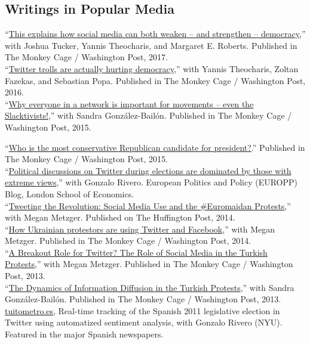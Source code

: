 \documentclass[margin,line,11pt]{resume}
\newcommand{\nl}{\vspace{0.10in}\\}
\begin{document}
\begin{resume}
                \section{\mysidestyle Writings in Popular Media}
``\href{https://www.washingtonpost.com/news/monkey-cage/wp/2017/12/06/this-explains-how-social-media-can-both-weaken-and-strengthen-democracy/?utm_term=.d52c930452e9}{This explains how social media can both weaken -- and strengthen -- democracy},'' with Joshua Tucker, Yannis Theocharis, and Margaret E. Roberts. Published in The Monkey Cage / Washington Post, 2017.\nl               
``\href{https://www.washingtonpost.com/news/monkey-cage/wp/2016/11/04/twitter-trolls-hurt-democracy-more-than-you-realize-heres-how/}{Twitter trolls are actually hurting democracy},'' with Yannis Theocharis, Zoltan Fazekas, and Sebastian Popa. Published in The Monkey Cage / Washington Post, 2016.\nl
``\href{https://www.washingtonpost.com/news/monkey-cage/wp/2015/11/30/why-everyone-in-a-network-is-important-for-movements-even-the-slactivists/}{Why everyone in a network is important for movements -- even the Slacktivists!},'' with Sandra Gonz\'{a}lez-Bail\'{o}n. Published in The Monkey Cage / Washington Post, 2015.

``\href{http://www.washingtonpost.com/blogs/monkey-cage/wp/2015/06/16/who-is-the-most-conservative-republican-candidate-for-president/}{Who is the most conservative Republican candidate for president?}.'' Published in The Monkey Cage / Washington Post, 2015.\nl
``\href{http://blogs.lse.ac.uk/politicsandpolicy/political-discussions-on-twitter-during-elections-are-dominated-by-those-with-extreme-views/}{Political discussions on Twitter during elections are dominated by those with extreme views},'' with Gonzalo Rivero. European Politics and Policy (EUROPP) Blog, London School of Economics.\nl
 ``\href{http://www.huffingtonpost.com/pablo-barbera/tweeting-the-revolution-s_b_4831104.html}{Tweeting the Revolution: Social Media Use and the \#Euromaidan Protests},'' with Megan Metzger. Published on The Huffington Post, 2014.\nl
 ``\href{http://www.washingtonpost.com/blogs/monkey-cage/wp/2013/12/04/strategic-use-of-facebook-and-twitter-in-ukrainian-protests/}{How Ukrainian protestors are using Twitter and Facebook},'' with Megan Metzger. Published in The Monkey Cage / Washington Post, 2014.\nl
 ``\href{http://themonkeycage.org/2013/06/01/a-breakout-role-for-twitter-extensive-use-of-social-media-in-the-absence-of-traditional-media-by-turks-in-turkish-in-taksim-square-protests/}{A Breakout Role for Twitter? The Role of Social Media in the Turkish Protests},'' with Megan Metzger. Published in The Monkey Cage / Washington Post, 2013.\nl
 ``\href{http://themonkeycage.org/2013/06/30822/}{The Dynamics of Information Diffusion in the Turkish Protests},'' with Sandra Gonz\'{a}lez-Bail\'{o}n. Published in The Monkey Cage / Washington Post, 2013.\nl
\href{http://www.tuitometro.es}{tuitometro.es}, Real-time tracking of the Spanish 2011 legislative election in Twitter using automatized sentiment analysis, with Gonzalo Rivero (NYU). Featured in the major Spanish newspapers.
  


\end{resume}
\end{document}
